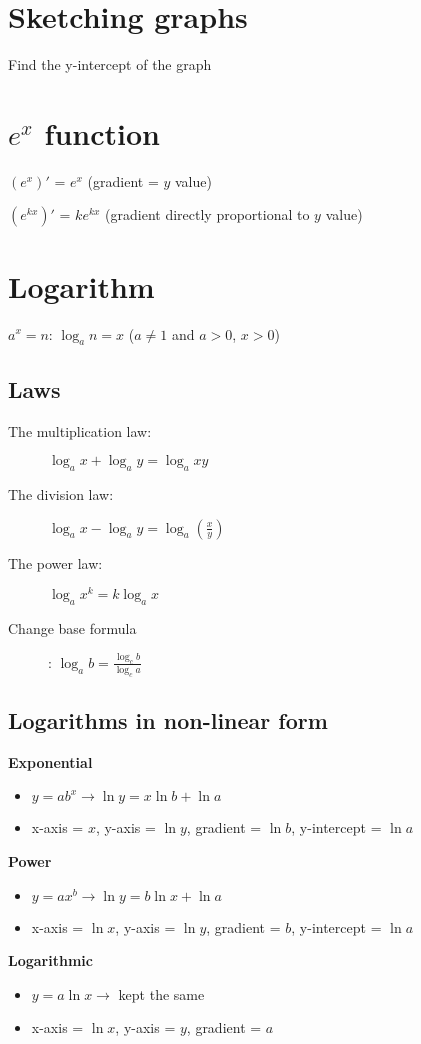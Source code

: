 \section{Sketching graphs}
Find the y-intercept of the graph

\section{$e^x$ function}
\begin{description}
    \item $(e^x)'$ = $e^x$ (gradient = $y$ value)
    \item $(e^{kx})'$ = $ke^{kx}$ (gradient directly proportional to $y$ value)
\end{description}

\section{Logarithm}
$a^x = n$: $\log_a n = x$ ($a\neq1$ and $a>0$, $x>0$)
\subsection{Laws}
\begin{description}
    \item[The multiplication law:] $\log_a x + \log_a y = \log_a xy$
    \item[The division law:] $\log_a x - \log_a y = \log_a\left(\frac{x}{y}\right)$
    \item[The power law:] $\log_a x^k = k\log_a x$
    \item[Change base formula]: $\log_a b = \frac{\log_c b}{\log_c a}$
\end{description}

\subsection{Logarithms in non-linear form}
\textbf{Exponential}
\begin{itemize}
    \item $y=ab^x\rightarrow\ln y = x\ln b + \ln a$
    \item x-axis = $x$, y-axis = $\ln y$, gradient = $\ln b$, y-intercept = $\ln a$
\end{itemize}
\textbf{Power}
\begin{itemize}
    \item $y=ax^b\rightarrow\ln y = b\ln x + \ln a$
    \item x-axis = $\ln x$, y-axis = $\ln y$, gradient = $b$, y-intercept = $\ln a$
\end{itemize}
\textbf{Logarithmic}
\begin{itemize}
    \item $y=a\ln x\rightarrow$ kept the same
    \item x-axis = $\ln x$, y-axis = $y$, gradient = $a$
\end{itemize}